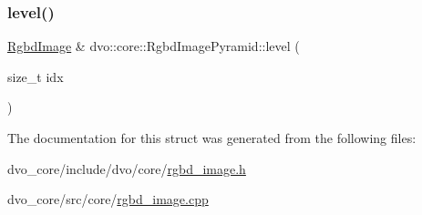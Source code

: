 \mbox{\label{structdvo_1_1core_1_1_rgbd_image_pyramid_a50961fbcb3f7402e0427de8649b145e8}} 
\subsubsection{\texorpdfstring{level()}{level()}}
{\footnotesize\ttfamily \mbox{\hyperlink{structdvo_1_1core_1_1_rgbd_image}{Rgbd\+Image}} \& dvo\+::core\+::\+Rgbd\+Image\+Pyramid\+::level (\begin{DoxyParamCaption}\item[{size\+\_\+t}]{idx }\end{DoxyParamCaption})}



The documentation for this struct was generated from the following files\+:\begin{DoxyCompactItemize}
\item 
dvo\+\_\+core/include/dvo/core/\mbox{\hyperlink{rgbd__image_8h}{rgbd\+\_\+image.\+h}}\item 
dvo\+\_\+core/src/core/\mbox{\hyperlink{rgbd__image_8cpp}{rgbd\+\_\+image.\+cpp}}\end{DoxyCompactItemize}
